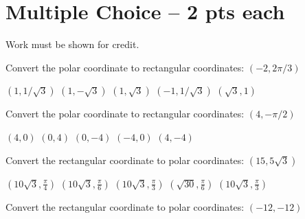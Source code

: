 \documentclass[11pt]{exam}
\begin{document}
\section*{Multiple Choice -- 2 pts each}
{\large Work must be shown for credit.}
\vspace{2ex}
\begin{questions}
	\begin{minipage}{\linewidth}
		\question Convert the polar coordinate to rectangular coordinates: $(-2, 2\pi/3)$

\begin{choices}
	\choice $\left(1,1/\sqrt{3}\right)$
	\CorrectChoice $\left(1,-\sqrt{3}\right)$
	\choice $\left(1,\sqrt{3}\right)$
	\choice $\left(-1,1/\sqrt{3}\right)$
	\choice $\left(\sqrt{3},1\right)$

\end{choices} \answerline
\end{minipage}

\begin{minipage}{\linewidth}
\question Convert the polar coordinate to rectangular coordinates: $(4,-\pi/2)$

\begin{choices}
	\choice $\left(4,0\right)$
	\choice $\left(0,4\right)$
	\CorrectChoice $\left(0,-4\right)$
	\choice $\left(-4,0\right)$
	\choice $\left(4,-4\right)$
\end{choices} \answerline
\end{minipage}

\begin{minipage}{\linewidth}



\question Convert the rectangular coordinate to polar coordinates: $(15, 5\sqrt{3})$

\begin{choices}
	\choice $\left(10 \sqrt{3},\frac{\pi }{4}\right)$
	\CorrectChoice $\left(10 \sqrt{3},\frac{\pi }{6}\right)$
	\choice $\left(10 \sqrt{3},\frac{\pi }{3}\right)$
	\choice $\left(\sqrt{30},\frac{\pi }{6}\right)$
	\choice $\left(10 \sqrt{3},\frac{\pi }{3}\right)$

\end{choices} \answerline
\end{minipage}

\begin{minipage}{\linewidth}



\question Convert the rectangular coordinate to polar coordinates: $(-12, -12)$


\end{minipage}
\end{questions}
\end{document}
